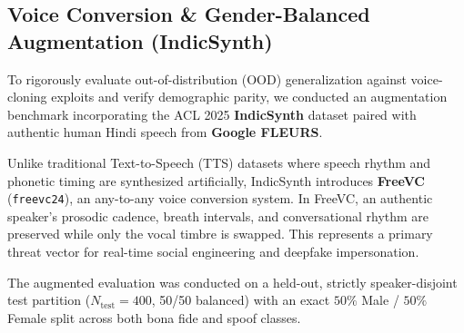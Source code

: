 \documentclass[11pt,a4paper]{article}
\begin{document}
\subsection{Voice Conversion \& Gender-Balanced Augmentation (IndicSynth)}
To rigorously evaluate out-of-distribution (OOD) generalization against voice-cloning exploits and verify demographic parity, we conducted an augmentation benchmark incorporating the ACL 2025 \textbf{IndicSynth} dataset \cite{sharma2025indicsynth} paired with authentic human Hindi speech from \textbf{Google FLEURS}. 

Unlike traditional Text-to-Speech (TTS) datasets where speech rhythm and phonetic timing are synthesized artificially, IndicSynth introduces \textbf{FreeVC} (\texttt{freevc24}), an any-to-any voice conversion system. In FreeVC, an authentic speaker's prosodic cadence, breath intervals, and conversational rhythm are preserved while only the vocal timbre is swapped. This represents a primary threat vector for real-time social engineering and deepfake impersonation.

The augmented evaluation was conducted on a held-out, strictly speaker-disjoint test partition ($N_{\text{test}} = 400$, 50/50 balanced) with an exact $50\%$ Male / $50\%$ Female split across both bona fide and spoof classes.

\begin{table}[h!]
\centering
\small
\caption{IndicSynth Multi-Speaker Augmentation Benchmark ($N_{\text{test}} = 400$, 50/50 Balanced)}
\label{tab:indicsynth_results}
\end{table}
\end{document}
